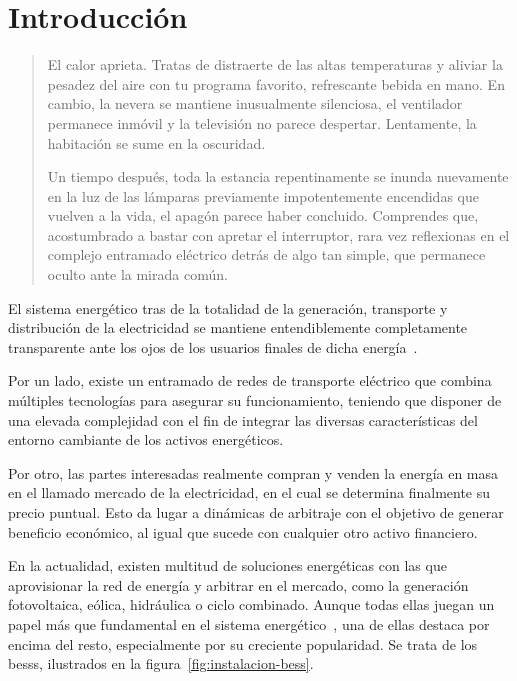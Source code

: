 \cleardoublepage

\chapter{Introducción}
\label{makereference1}

\begin{quotation}

  El calor aprieta. Tratas de distraerte de las altas temperaturas y aliviar la pesadez del aire con tu programa favorito, refrescante bebida en mano. En cambio, la nevera se mantiene inusualmente silenciosa, el ventilador permanece inmóvil y la televisión no parece despertar. Lentamente, la habitación se sume en la oscuridad.

  Un tiempo después, toda la estancia repentinamente se inunda nuevamente en la luz de las lámparas previamente impotentemente encendidas que vuelven a la vida, el apagón parece haber concluido. Comprendes que, acostumbrado a bastar con apretar el interruptor, rara vez reflexionas en el complejo entramado eléctrico detrás de algo tan simple, que permanece oculto ante la mirada común.

\end{quotation}

El sistema energético tras de la totalidad de la generación, transporte y distribución de la electricidad se mantiene entendiblemente completamente transparente ante los ojos de los usuarios finales de dicha energía~\cite{garrues2009red}.

Por un lado, existe un entramado de redes de transporte eléctrico que combina múltiples tecnologías para asegurar su funcionamiento, teniendo que disponer de una elevada complejidad con el fin de integrar las diversas características del entorno cambiante de los activos energéticos.

Por otro, las partes interesadas realmente compran y venden la energía en masa en el llamado mercado de la electricidad, en el cual se determina finalmente su precio puntual. Esto da lugar a dinámicas de arbitraje con el objetivo de generar beneficio económico, al igual que sucede con cualquier otro activo financiero.

En la actualidad, existen multitud de soluciones energéticas con las que aprovisionar la red de energía y arbitrar en el mercado, como la generación fotovoltaica, eólica, hidráulica o ciclo combinado. Aunque todas ellas juegan un papel más que fundamental en el sistema energético~\cite{turkenburg2000renewable}, una de ellas destaca por encima del resto, especialmente por su creciente popularidad. Se trata de los \glspl{bess}, ilustrados en la figura~\ref{fig:instalacion-bess}.

